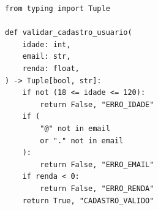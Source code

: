 \ifmostrarGabarito
\begin{verbatim}
from typing import Tuple

def validar_cadastro_usuario(
    idade: int,
    email: str,
    renda: float,
) -> Tuple[bool, str]:
    if not (18 <= idade <= 120):
        return False, "ERRO_IDADE"
    if (
        "@" not in email
        or "." not in email
    ):
        return False, "ERRO_EMAIL"
    if renda < 0:
        return False, "ERRO_RENDA"
    return True, "CADASTRO_VALIDO" 
\end{verbatim}

\fi
